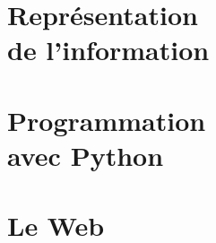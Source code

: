 \documentclass[10pt,a4paper]{nsibook}
\begin{document}
\part{Représentation\\ de l'information}






\part{Programmation\\ avec Python}




 
 
 
 
 


 
 
 
 









 
 
 

 \part{Le Web}
\end{document}
